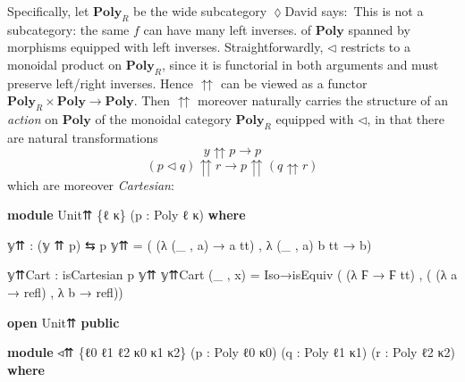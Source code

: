 \documentclass[
  11pt,
  oneside,
  article]{memoir}
\newenvironment{Shaded}{}{}
\newcommand{\KeywordTok}[1]{\textcolor[rgb]{0.00,0.44,0.13}{\textbf{#1}}}
\newcommand{\NormalTok}[1]{#1}
\newcommand{\OtherTok}[1]{\textcolor[rgb]{0.00,0.44,0.13}{#1}}
\theoremstyle{definition}
\theoremstyle{plain}
\newcommand{\Cat}[1]{\mathbf{#1}}%
\newcommand{\poly}{\Cat{Poly}}
\newcommand{\0}{\textsf{0}}
\newcommand{\1}{\tn{\textsf{1}}}
\newcommand{\dnote}[1]{{\quad \color{blue}$\lozenge$\;David says:}~#1\;{\color{blue}$\lozenge$}\quad}
\begin{document}
Specifically, let \(\poly_{R}\) be the wide subcategory \dnote{This is not a subcategory: the same $f$ can have many left inverses.} of
\(\poly\) spanned by morphisms equipped with left inverses.
Straightforwardly, \(\triangleleft\) restricts to a monoidal product on
\(\poly_R\), since it is functorial in both arguments and must
preserve left/right inverses. Hence \(\upuparrows\) can be viewed as a
functor \(\poly_R \times \poly \to \poly\). Then
\(\upuparrows\) moreover naturally carries the structure of an
\emph{action} on \(\poly\) of the monoidal category
\(\poly_R\) equipped with \(\triangleleft\), in that there are
natural transformations \[
y \upuparrows p \to p \] \[
(p \triangleleft q) \upuparrows r \to p \upuparrows (q \upuparrows r)
\] which are moreover \emph{Cartesian}:

\begin{Shaded}
\begin{Highlighting}[]
\KeywordTok{module}\NormalTok{ Unit⇈ }\OtherTok{\{}\NormalTok{ℓ κ}\OtherTok{\}} \OtherTok{(}\NormalTok{p }\OtherTok{:}\NormalTok{ Poly ℓ κ}\OtherTok{)} \KeywordTok{where}

\NormalTok{    𝕪⇈ }\OtherTok{:} \OtherTok{(}\NormalTok{𝕪 ⇈ p}\OtherTok{)}\NormalTok{ ⇆ p}
\NormalTok{    𝕪⇈ }\OtherTok{=} \OtherTok{(} \OtherTok{(λ} \OtherTok{(\_}\NormalTok{ , a}\OtherTok{)} \OtherTok{→}\NormalTok{ a tt}\OtherTok{)}\NormalTok{ , }\OtherTok{λ} \OtherTok{(\_}\NormalTok{ , a}\OtherTok{)}\NormalTok{ b tt }\OtherTok{→}\NormalTok{ b}\OtherTok{)}

\NormalTok{    𝕪⇈Cart }\OtherTok{:}\NormalTok{ isCartesian p 𝕪⇈}
\NormalTok{    𝕪⇈Cart }\OtherTok{(\_}\NormalTok{ , x}\OtherTok{)} \OtherTok{=} 
\NormalTok{        Iso→isEquiv }\OtherTok{(} \OtherTok{(λ}\NormalTok{ Ϝ }\OtherTok{→}\NormalTok{ Ϝ tt}\OtherTok{)} 
\NormalTok{                    , }\OtherTok{(} \OtherTok{(λ}\NormalTok{ a }\OtherTok{→}\NormalTok{ refl}\OtherTok{)} 
\NormalTok{                      , }\OtherTok{λ}\NormalTok{ b }\OtherTok{→}\NormalTok{ refl}\OtherTok{))}

\KeywordTok{open}\NormalTok{ Unit⇈ }\KeywordTok{public}

\KeywordTok{module}\NormalTok{ ◃⇈ }\OtherTok{\{}\NormalTok{ℓ0 ℓ1 ℓ2 κ0 κ1 κ2}\OtherTok{\}} \OtherTok{(}\NormalTok{p }\OtherTok{:}\NormalTok{ Poly ℓ0 κ0}\OtherTok{)} 
          \OtherTok{(}\NormalTok{q }\OtherTok{:}\NormalTok{ Poly ℓ1 κ1}\OtherTok{)} \OtherTok{(}\NormalTok{r }\OtherTok{:}\NormalTok{ Poly ℓ2 κ2}\OtherTok{)} \KeywordTok{where}


\end{Highlighting}
\end{Shaded}
\end{document}
